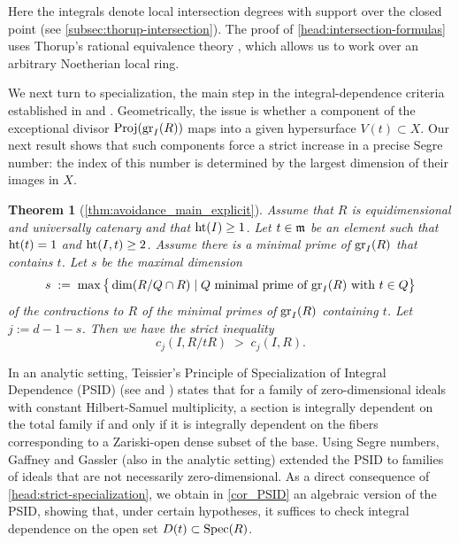 \documentclass[a4paper, 11pt]{amsart}
\newcommand{\mm}{{\normalfont\mathfrak{m}}}
\newcommand{\HT}{\normalfont\text{ht}}
\newcommand{\gr}{{\normalfont\text{gr}}}
\newcommand{\Proj}{\normalfont\text{Proj}}
\newcommand{\Spec}{\normalfont\text{Spec}}
\newtheorem{headthm}{Theorem}
\theoremstyle{definition}
\begin{document}
	Here the integrals denote local intersection degrees with support over the closed point (see \autoref{subsec:thorup-intersection}). 
	The proof of \autoref{head:intersection-formulas} uses Thorup's rational equivalence theory \cite{Thorup}, which allows us to work over an arbitrary Noetherian local ring. 
	
	
	\smallskip
	
We next turn to specialization, the main step in the integral-dependence criteria established in \cite{GG} and \cite{PTUV}.
	Geometrically, the issue is	whether a component of the exceptional divisor $\Proj(\gr_I(R))$ maps into a given hypersurface $V(t)\subset X$.
	Our next result shows that such components force a strict increase in a precise Segre number: the index of this number is determined by the largest dimension of their images in $X$.
	
	\begin{headthm}[\autoref{thm:avoidance_main_explicit}]
		\label{head:strict-specialization}
		Assume that $R$ is equidimensional and universally catenary and that $\HT(I) \ge 1$.
		Let $t\in\mm$ be an element such that $\HT(t) = 1$ and $\HT(I, t) \ge 2$.
		Assume there is a minimal prime of $\gr_I(R)$ that contains $t$. 
		Let $s$ be the maximal dimension
		$$
		s \;:=\; \max\big\lbrace \dim(R/Q \cap R) \mid \text{$Q$ minimal prime of $\gr_I(R)$ with $t \in Q$}\big\rbrace
		$$
		of the contractions to $R$ of the minimal primes of $\gr_I(R)$ containing $t$.
		Let $j := d-1-s$.
		Then we have the strict inequality
		$$
		c_j(I, R/tR) \;>\; c_j(I, R).
		$$
	\end{headthm}
	
	
	In an analytic setting, Teissier’s Principle of Specialization of Integral Dependence (PSID) (see \cite{TEISSIER_CYC} and \cite[Appendice~I]{TEISSIER_RES2}) states that for a family of zero-dimensional ideals with constant Hilbert-Samuel multiplicity, a section is integrally	dependent on the total family if and only if it is integrally dependent on the fibers corresponding to a Zariski-open dense subset of the base. 
	Using Segre numbers, Gaffney and Gassler \cite{GG} (also in the analytic setting) extended the PSID to families of ideals that are not necessarily zero-dimensional.	
	As a direct consequence of \autoref{head:strict-specialization}, we obtain in \autoref{cor_PSID} an algebraic version of the PSID, showing that, under certain hypotheses, it suffices to check integral dependence on the open set $D(t)\subset \Spec(R)$.
	
	
	\smallskip
	
\end{document}
